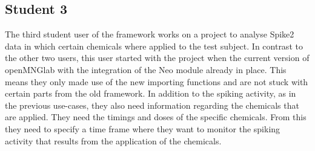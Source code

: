 \subsection{Student 3}

The third student user of the framework works on a project to analyse Spike2 data in which certain chemicals where applied to the test subject. In contrast to the other two users, this user started with the project when the current version of openMNGlab with the integration of the Neo module already in place. This means they only made use of the new importing functions and are not stuck with certain parts from the old framework. In addition to the spiking activity, as in the previous use-cases, they also need information regarding the chemicals that are applied. They need the timings and doses of the specific chemicals. From this they need to specify a time frame where they want to monitor the spiking activity that results from the application of the chemicals.\\


